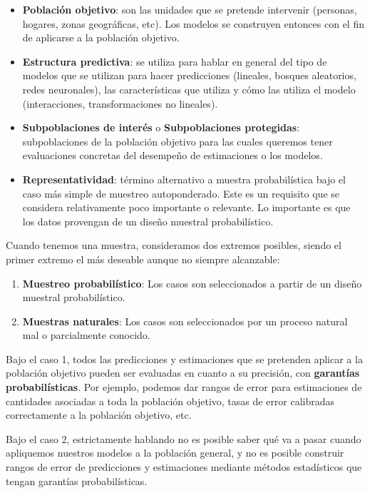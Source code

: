 \documentclass[
]{book}
\providecommand{\tightlist}{%
  \setlength{\itemsep}{0pt}\setlength{\parskip}{0pt}}
\begin{document}
\begin{itemize}
\item
  \textbf{Población objetivo}: son las unidades que se pretende intervenir
  (personas, hogares, zonas geográficas, etc). Los modelos se construyen entonces
  con el fin de aplicarse a la población objetivo.
\item
  \textbf{Estructura predictiva}: se utiliza para hablar en general
  del tipo de modelos que
  se utilizan para hacer predicciones (lineales, bosques aleatorios, redes neuronales),
  las características que utiliza y cómo las utiliza el modelo (interacciones, transformaciones
  no lineales).
\item
  \textbf{Subpoblaciones de interés} o \textbf{Subpoblaciones protegidas}: subpoblaciones de la población objetivo para las cuales queremos tener evaluaciones concretas del desempeño de estimaciones o los modelos.
\item
  \textbf{Representatividad}: término alternativo a muestra probabilística bajo el caso más
  simple de muestreo autoponderado. Este es un requisito que se considera relativamente poco importante
  o relevante. Lo importante es que los datos provengan de un diseño muestral probabilístico.
\end{itemize}

Cuando tenemos una muestra, consideramos dos extremos posibles, siendo el primer extremo
el más deseable aunque no siempre alcanzable:

\begin{enumerate}
\def\labelenumi{\arabic{enumi}.}
\tightlist
\item
  \textbf{Muestreo probabilístico}: Los casos son seleccionados a partir de un diseño muestral probabilístico.
\item
  \textbf{Muestras naturales}: Los casos son seleccionados por un proceso natural mal o parcialmente conocido.
\end{enumerate}

Bajo el caso 1, todos las predicciones y estimaciones que se pretenden aplicar
a la población objetivo pueden ser evaluadas en cuanto
a su precisión, con \textbf{garantías probabilísticas}.
Por ejemplo, podemos dar rangos de error para estimaciones de cantidades asociadas
a toda la población objetivo, tasas de error calibradas
correctamente a la población objetivo, etc.

Bajo el caso 2, estrictamente hablando no es posible saber qué va a pasar cuando apliquemos
nuestros modelos a la población general, y no es posible construir rangos de error de
predicciones y estimaciones mediante métodos estadísticos que tengan garantías
probabilísticas.
\end{document}
